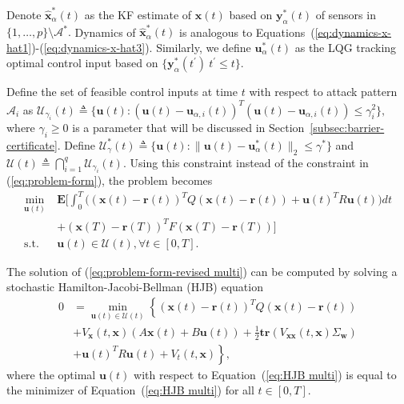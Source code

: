 \documentclass[journal]{IEEEtran}
\begin{document}
Denote $\mathbf{\hat{x}}_{\alpha}^{\ast}(t)$ as the KF estimate of $\mathbf{x}(t)$ based on $\mathbf{y}_{\alpha}^{\ast}(t)$ of sensors in $\{1,\ldots,p\} \setminus \mathcal{A}^{\ast}.$ Dynamics of $\mathbf{\hat{x}}_{\alpha}^{\ast}(t)$ is analogous to Equations~(\ref{eq:dynamics-x-hat1})-(\ref{eq:dynamics-x-hat3}). Similarly, we define $\mathbf{u}_{\alpha}^{\ast}(t)$ as the LQG tracking optimal control input based on $\{\mathbf{y}_{\alpha}^{\ast}(t^{\prime}) \ t^{\prime} \leq t\}$. 


Define the set of feasible control inputs at time $t$ with respect to attack pattern $\mathcal{A}_i$ as 
$\mathcal{U}_{\gamma_i}(t) \triangleq \{\mathbf{u}(t) : \left(\mathbf{u}(t) - \mathbf{u}_{\alpha,i}(t)\right)^T\left(\mathbf{u}(t) - \mathbf{u}_{\alpha,i}(t)\right) \leq \gamma_i^2\},$
where $\gamma_i \geq 0$ is a parameter that will be discussed in Section~\ref{subsec:barrier-certificate}. Define $\mathcal{U}_{\gamma}^{\ast}(t) \triangleq \{\mathbf{u}(t) : \|\mathbf{u}(t)-\mathbf{u}_{\alpha}^{\ast}(t)\|_{2} \leq \gamma^{\ast}\}$ and $\mathcal{U}(t) \triangleq \bigcap_{i = 1}^{q} \mathcal{U}_{\gamma_i}(t).$ Using this constraint instead of the constraint in (\ref{eq:problem-form}), the problem becomes
\begin{subequations}\label{eq:problem-form-revised multi}
 \begin{align}
 \min_{\mathbf{u}(t)} \ & \mathbf{E}[\int_{0}^{T}{((\mathbf{x}(t)-\mathbf{r}(t))^{T}Q(\mathbf{x}(t)-\mathbf{r}(t)) }   + \mathbf{u}(t)^{T}R\mathbf{u}(t))  dt \nonumber \\
 &+(\mathbf{x}(T)-\mathbf{r}(T))^{T}F(\mathbf{x}(T)-\mathbf{r}(T)) ] \label{eq:problem-form-revised obj multi}\\
 \mbox{s.t.} \ & \mathbf{u}(t) \in \mathcal{U}(t), \forall t \in [0,T]. \label{eq:problem-form-revised con multi}
 \end{align}
 \end{subequations} 

The solution of (\ref{eq:problem-form-revised multi}) can be computed by solving a stochastic Hamilton-Jacobi-Bellman (HJB) equation~\cite{kirk2004optimal}
\begin{equation}
\label{eq:HJB multi}
    \begin{array}{ll}
        0 &= \min_{\mathbf{u}(t) \in \mathcal{U}(t)}{\left\{(\mathbf{x}(t)-\mathbf{r}(t))^{T}Q(\mathbf{x}(t)-\mathbf{r}(t)) \right.} \\
        &+ V_{\mathbf{x}}(t,\mathbf{x})(A\mathbf{x}(t)+B\mathbf{u}(t)) + \frac{1}{2}\mathbf{tr}(V_{\mathbf{x}\mathbf{x}}(t,\mathbf{x})\Sigma_{\mathbf{w}})\\
        &+ \left.\mathbf{u}(t)^{T}R\mathbf{u}(t) + V_{t}(t,\mathbf{x})  \right\},
    \end{array}
\end{equation}
where the optimal $\mathbf{u}(t)$ with respect to Equation~(\ref{eq:HJB multi}) is equal to the minimizer of Equation~(\ref{eq:HJB multi}) for all $t \in [0, T].$
\end{document}
